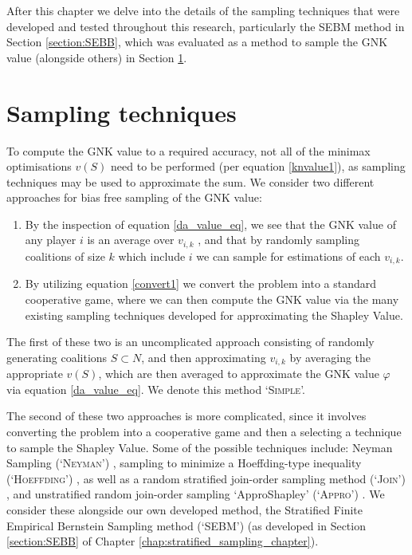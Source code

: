 After this chapter we delve into the details of the sampling techniques that were developed and tested throughout this research, particularly the \textsc{SEBM} method in Section \ref{section:SEBB}, which was evaluated as a method to sample the GNK value (alongside others) in Section \ref{sec:sampling_techniques}.


\section{Sampling techniques}\label{sec:sampling_techniques}
To compute the GNK value to a required accuracy, not all of the minimax optimisations $v(S)$ need to be performed (per equation \ref{knvalue1}), as sampling techniques may be used to approximate the sum.
We consider two different approaches for bias free sampling of the GNK value:
\begin{enumerate}
    \item By the inspection of equation \ref{da_value_eq}, we see that the GNK value of any player $i$ is an average over $v_{i,k}$%
, and that by randomly sampling coalitions of size $k$ which include $i$ we can sample for estimations of each $v_{i,k}$.
    \item By utilizing equation \ref{convert1} we convert the problem into a standard cooperative game, where we can then compute the GNK value via the many existing sampling techniques developed for approximating the Shapley Value.
\end{enumerate}

The first of these two is an uncomplicated approach consisting of randomly generating coalitions $S\subset N$, %
and then approximating $v_{i,k}$ by averaging the appropriate $v(S)$, which are then averaged to approximate the GNK value $\varphi$ via equation \ref{da_value_eq}. We denote this method `\textsc{Simple}'.

The second of these two approaches is more complicated, since it involves converting the problem into a cooperative game and then a selecting a technique to sample the Shapley Value.
Some of the possible techniques include: Neyman Sampling (`\textsc{Neyman}') \citep{CASTRO2017180,1938.10503378}, sampling to minimize a Hoeffding-type inequality (`\textsc{Hoeffding}') \citep{2013arXiv1306.4265M}, as well as a random stratified join-order sampling method (`\textsc{Join}') \citep{CASTRO2017180}, and unstratified random join-order sampling `ApproShapley' (`\textsc{Appro}') \citep{DBLP:journals/cor/CastroGT09}.
We consider these alongside our own developed method, the Stratified Finite Empirical Bernstein Sampling method (`SEBM') (as developed in Section \ref{section:SEBB} of Chapter \ref{chap:stratified_sampling_chapter}).


